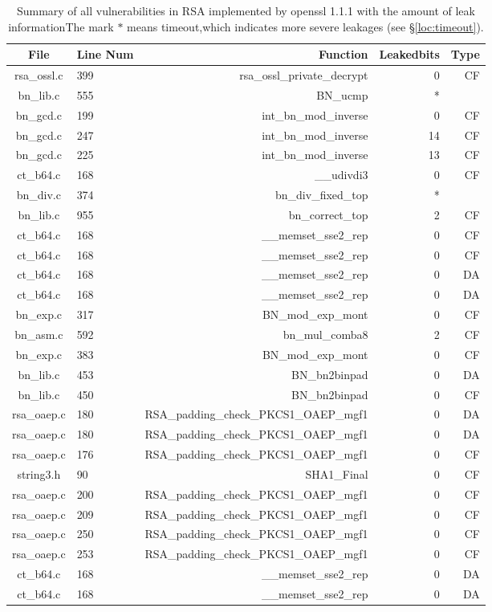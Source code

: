 \begin{table*}%
\centering
\caption{Summary of all vulnerabilities in RSA implemented by openssl 1.1.1 with the amount of leak informationThe mark $*$ means timeout,which indicates more severe leakages (see \S\ref{loc:timeout}).}\label{tab:RSAopenssl}
\begin{tabular}{clrrr}
\hline
\textbf{File} & \textbf{Line Num} & \textbf{Function} & \textbf{Leakedbits} & \textbf{Type} \\\hline
rsa\_ossl.c& 399&rsa\_ossl\_private\_decrypt&0 &CF\\
bn\_lib.c& 555&BN\_ucmp&*&\\
bn\_gcd.c& 199&int\_bn\_mod\_inverse&0 &CF\\
bn\_gcd.c& 247&int\_bn\_mod\_inverse&14&CF\\
bn\_gcd.c& 225&int\_bn\_mod\_inverse&13&CF\\
ct\_b64.c& 168&\_\_udivdi3&0 &CF\\
bn\_div.c& 374&bn\_div\_fixed\_top&*&\\
bn\_lib.c& 955&bn\_correct\_top&2 &CF\\
ct\_b64.c& 168&\_\_memset\_sse2\_rep&0 &CF\\
ct\_b64.c& 168&\_\_memset\_sse2\_rep&0 &CF\\
ct\_b64.c& 168&\_\_memset\_sse2\_rep&0 &DA\\
ct\_b64.c& 168&\_\_memset\_sse2\_rep&0 &DA\\
bn\_exp.c& 317&BN\_mod\_exp\_mont&0 &CF\\
bn\_asm.c& 592&bn\_mul\_comba8&2 &CF\\
bn\_exp.c& 383&BN\_mod\_exp\_mont&0 &CF\\
bn\_lib.c& 453&BN\_bn2binpad&0 &DA\\
bn\_lib.c& 450&BN\_bn2binpad&0 &CF\\
rsa\_oaep.c& 180&RSA\_padding\_check\_PKCS1\_OAEP\_mgf1&0 &DA\\
rsa\_oaep.c& 180&RSA\_padding\_check\_PKCS1\_OAEP\_mgf1&0 &DA\\
rsa\_oaep.c& 176&RSA\_padding\_check\_PKCS1\_OAEP\_mgf1&0 &CF\\
string3.h& 90&SHA1\_Final&0 &CF\\
rsa\_oaep.c& 200&RSA\_padding\_check\_PKCS1\_OAEP\_mgf1&0 &CF\\
rsa\_oaep.c& 209&RSA\_padding\_check\_PKCS1\_OAEP\_mgf1&0 &CF\\
rsa\_oaep.c& 250&RSA\_padding\_check\_PKCS1\_OAEP\_mgf1&0 &CF\\
rsa\_oaep.c& 253&RSA\_padding\_check\_PKCS1\_OAEP\_mgf1&0 &CF\\
ct\_b64.c& 168&\_\_memset\_sse2\_rep&0 &DA\\
ct\_b64.c& 168&\_\_memset\_sse2\_rep&0 &DA\\
\hline
\end{tabular}
\end{table*}
